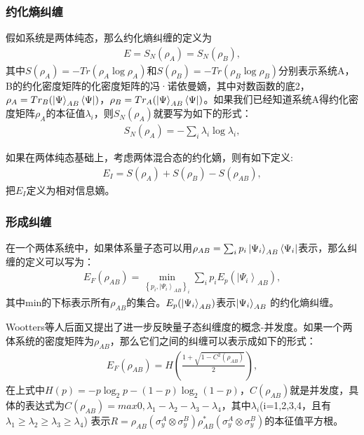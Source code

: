 \subsubsection{约化熵纠缠}
假如系统是两体纯态，那么约化熵纠缠的定义\cite{phoenix1990periodicity,phoenix1991establishment}为
\begin{align}\label{eq2244}
E=S_N(\rho_A)=S_N(\rho_B),
\end{align}
其中$S(\rho_A)=-Tr(\rho_A\log\rho_A)$和$S(\rho_B)=-Tr(\rho_B\log\rho_B)$分别表示系统A，B的约化密度矩阵的化密度矩阵的冯·诺依曼嫡，其中对数函数的底2，$\rho_A=Tr_B(\ket{\Psi}_{AB}\bra{\Psi})$，$\rho_B=Tr_A(\ket{\Psi}_{AB}\bra{\Psi})$。如果我们已经知道系统A得约化密度矩阵$\rho_A$的本征值$\lambda_i$，则$S_N(\rho_A)$就要写为如下的形式：
\begin{align}\label{eq2245}
S_N(\rho_A)=-\sum_i\lambda_i\log\lambda_i,
\end{align}

如果在两体纯态基础上，考虑两体混合态的约化嫡，则有如下定义:
\begin{align}\label{eq2246}
E_I=S(\rho_A)+S(\rho_B)-S(\rho_{AB}),
\end{align}
把$E_I$定义为相对信息嫡。
\subsubsection{形成纠缠}
在一个两体系统中，如果体系量子态可以用$\rho_{AB}=\sum_i p_i\ket{\Psi_i}_{AB}\bra{\Psi_i}$表示，那么纠缠的定义可以写为\cite{zhang2007thermal}：
\begin{align}\label{eq2247}
E_F(\rho_{AB})=\mathop {\min }\limits_{{{\left\{ {{p_i},{{\left| {{\Psi _i}} \right\rangle }_{AB}}} \right\}}_i}} \sum\limits_i {{p_i}{E_p}({{\left| {{\Psi _i}} \right\rangle }_{AB}})} ,
\end{align}
其中min的下标表示所有$\rho_{AB}$的集合。$E_p(\ket{\Psi_i}_{AB})$表示$\ket{\Psi_i}_{AB}$
的约化熵纠缠。

Wootters等人后面又提出了进一步反映量子态纠缠度的概念-并发度。如果一个两体系统的密度矩阵为$\rho_{AB}$，那么它们之间的纠缠可以表示成如下的形式：
\begin{align}\label{eq2248}
E_F(\rho_{AB})=H(\frac{1+\sqrt{1-C^2(\rho_{AB})}}2),
\end{align}
在上式中$H(p)=-p\log_2p-(1-p)\log_2(1-p)$，$C(\rho_{AB})$就是并发度，具体的表达式为$C(\rho_{AB})=max{0,\lambda_1-\lambda_2-\lambda_3-\lambda_4}$，其中$\lambda_i$(i=1,2,3,4，且有$\lambda_1\ge\lambda_2\ge\lambda_3\ge\lambda_4$)
表示$R=\rho_{AB}(\sigma_y^A\otimes\sigma_y^B)\rho_{AB}^*(\sigma_y^A\otimes\sigma_y^B)$的本征值平方根。

